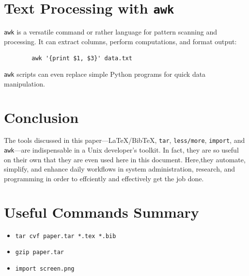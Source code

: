 \documentclass[11pt]{article}
\begin{document}
	\section{Text Processing with \texttt{awk}}
	\texttt{awk} is a versatile command or rather language for pattern scanning and processing. It can extract columns, perform computations, and format output:
	\begin{verbatim}
		awk '{print $1, $3}' data.txt
	\end{verbatim}
	\texttt{awk} scripts can even replace simple Python programs for quick data manipulation\cite{awk}.
	
	\section{Conclusion}
	The tools discussed in this paper—LaTeX/BibTeX, \texttt{tar}, \texttt{less/more}, \texttt{import}, and \texttt{awk}—are indispensable in a Unix developer’s toolkit. In fact, they are so useful on their own that they are even used here in this document. Here,they automate, simplify, and enhance daily workflows in system administration, research, and programming in order to effciently and effectively get the job done. 
	
	\section*{Useful Commands Summary}
	\begin{itemize}
		\item \texttt{tar cvf paper.tar *.tex *.bib}
		\item \texttt{gzip paper.tar}
		\item \texttt{import screen.png}
	\end{itemize}
	
	
	
	
\end{document}
